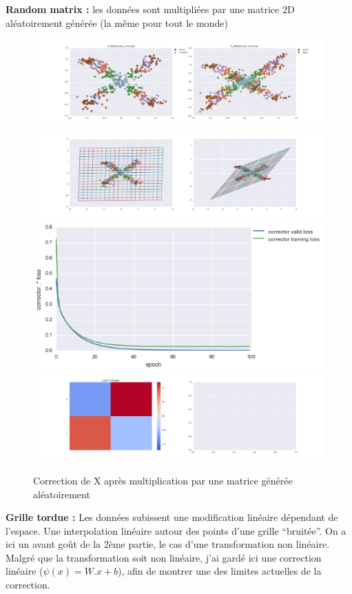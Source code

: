 {\Large \textbf{Random matrix :}} les données sont multipliées par une matrice 2D aléatoirement générée
 (la même pour tout le monde)

\begin{figure}[H] %
\centering
\includegraphics[width=\linewidth]{fig/24-05-2016/X/X_RMatCluster_Corrector-DATA.png}
\includegraphics[width=\linewidth]{fig/24-05-2016/X/X_RMatCluster_Corrector-GridCheck.png}
\includegraphics[width=0.45\linewidth]{fig/24-05-2016/X/X_RMatCluster_Corrector-Learning_curve.png}
\includegraphics[width=\linewidth]{fig/24-05-2016/X/X_RMatCluster_Corrector-W.png}
\caption{Correction de X après multiplication par une matrice générée aléatoirement}
\label{fig:recap-X-RMat-cluster}
\end{figure}

{\Large \textbf{Grille tordue :}} Les données subissent une modification linéaire dépendant de l'espace.
Une interpolation linéaire autour des points d'une grille ``bruitée''.
On a ici un avant goût de la 2ème partie, le cas d'une transformation non linéaire.
Malgré que la transformation soit non linéaire, j'ai gardé ici une correction linéaire ($\psi(x) = W.x+b$),
afin de montrer une des limites actuelles de la correction.

